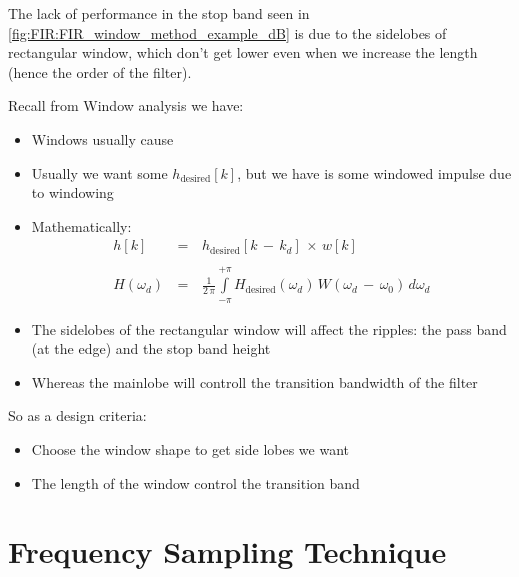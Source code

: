 The lack of performance in the stop band seen in \autoref{fig:FIR:FIR_window_method_example_dB} is due to the sidelobes of rectangular window, which don't get lower even when we increase the length (hence the order of the filter).

Recall from Window analysis we have:

\begin{itemize}
    
\item Windows usually cause 

\item Usually we want some $h_{\text{desired}}[k]$, but we have is some windowed impulse due to windowing

\item Mathematically:
\begin{equation}
\begin{array}{rcl}
     h[k] \, &=& \, h_{\text{desired}}[k \, - \, k_d] \, \times \, w[k]  \\ \\
     H(\omega_d) \, &=& \, \displaystyle\frac{1}{2 \, \pi} \displaystyle\int\limits_{- \pi}^{+\pi} H_{\text{desired}}(\omega_d) \, W(\omega_d \, - \, \omega_0) \, d\omega_d
\end{array}    
\end{equation}

\item The sidelobes of the rectangular window will affect the ripples: the pass band (at the edge) and the stop band height

\item Whereas the mainlobe will controll the transition bandwidth of the filter

\end{itemize}


So as a design criteria:

\begin{itemize}
    \item Choose the window shape to get side lobes we want
    
    
    \item The length of the window control the transition band
    
\end{itemize}


\section{Frequency Sampling Technique}

